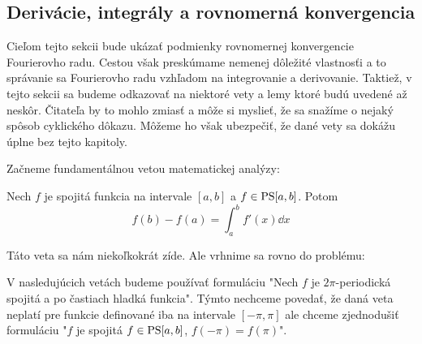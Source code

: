 \subsection{Derivácie, integrály a rovnomerná konvergencia}

Cieľom tejto sekcii bude ukázať podmienky rovnomernej konvergencie
Fourierovho radu. Cestou však preskúmame nemenej dôležité vlastnosťi
a to správanie sa Fourierovho radu vzhľadom na integrovanie a
derivovanie. Taktiež, v tejto sekcii sa budeme odkazovať na niektoré
vety a lemy ktoré budú uvedené až neskôr. Čitateľa by to mohlo zmiasť
a môže si myslieť, že sa snažíme o nejaký spôsob cyklického dôkazu.
Môžeme ho však ubezpečiť, že dané vety sa dokážu úplne bez tejto
kapitoly.

Začneme fundamentálnou vetou matematickej analýzy:
\begin{veta}
    Nech $f$ je spojitá funkcia na intervale $[a,b]$ a $f\in\mbox{PS}[a,b]$.
    Potom
    \begin{equation*}
        f(b) - f(a) = \int_a^b f'(x) \dd x
    \end{equation*}
\end{veta}
Táto veta sa nám niekoľkokrát zíde. Ale vrhnime sa rovno do problému:

\begin{poznamka}
    V nasledujúcich vetách budeme používať formuláciu "Nech $f$ je 
    $2\pi$-periodická spojitá a po častiach hladká funkcia". Týmto
    nechceme povedať, že daná veta neplatí pre funkcie definované iba
    na intervale $[-\pi,\pi]$ ale chceme zjednodušiť formuláciu
    "$f$ je spojitá $f\in\mbox{PS}[a,b]$, $f(-\pi)=f(\pi)$".
\end{poznamka}

